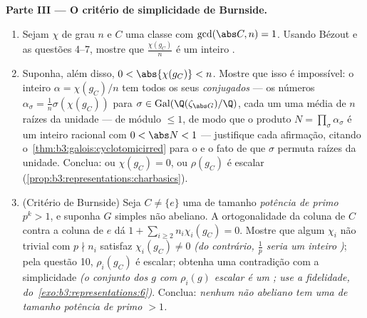 \begin{problem}
\medskip
\noindent\textbf{Parte III --- O critério de simplicidade de
Burnside.}
\begin{enumerate}[resume]
  \item Sejam $\chi$  de grau $n$ e $C$ uma classe
        com $\gcd(\abs C, n) = 1$. Usando Bézout e as questões 4--7, mostre que $\frac{\chi(g_C)}{n}$ é
        um inteiro .
  \item Suponha, além disso, $0 < \abs{\chi(g_C)} < n$. Mostre que isso é impossível: o
        inteiro  $\alpha =
        \chi(g_C)/n$ tem todos os seus \emph{conjugados} ---
        os números $\alpha_\sigma = \frac1n\sigma(\chi(g_C))$ para $\sigma \in \operatorname{Gal}(\Q(\zeta_{\abs G})/\Q)$, cada um uma média de $n$
        raízes da unidade --- de módulo $\leq 1$, de modo que o
        produto $N = \prod_\sigma\alpha_\sigma$ é um inteiro  racional com $0 < \abs N < 1$ ---
        justifique cada afirmação, citando o~\cref{thm:b3:galois:cyclotomicirred} para o  e o fato de que $\sigma$ permuta raízes da
        unidade. Conclua: ou $\chi(g_C) = 0$, ou $\rho(g_C)$ é escalar
        (\cref{prop:b3:representations:charbasics}).
  \item (Critério de Burnside) Seja $C \neq \{e\}$ uma  de
        tamanho \emph{potência de primo} $p^k > 1$, e suponha $G$
        simples não abeliano. A ortogonalidade da coluna de $C$
        contra a coluna de $e$ dá $1 + \sum_{i \geq 2} n_i\chi_i(g_C) = 0$. Mostre que algum
        $\chi_i$ não trivial com $p \nmid n_i$ satisfaz $\chi_i(g_C) \neq 0$ \emph{(do
        contrário, $\frac1p$ seria um inteiro )}; pela questão 10,
        $\rho_i(g_C)$ é escalar; obtenha uma contradição com a simplicidade
        \emph{(o conjunto dos $g$ com $\rho_i(g)$ escalar é um ; use a fidelidade, do~\cref{exo:b3:representations:6})}. Conclua:
        \emph{nenhum  não abeliano tem uma  de tamanho potência de primo $> 1$.}
\end{enumerate}


\end{problem}
